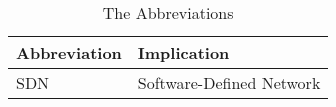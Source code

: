 
\begin{table}[ht]
        \caption{The Abbreviations}
        \begin{center}
            \begin{tabularx}{\textwidth}{|l|X|}
                \hline
                {\bf Abbreviation } & {\bf Implication} \\\hline
                SDN & Software-Defined Network\\ \hline
            \end{tabularx}
        \end{center}\label{tab:abbreviation}
\end{table}